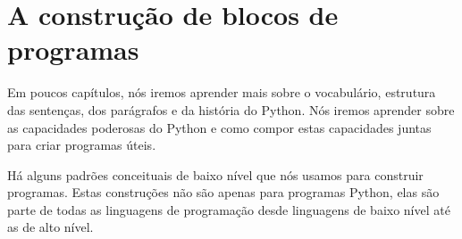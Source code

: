 \section{A construção de blocos de programas}
%

Em poucos capítulos, nós iremos aprender mais sobre o vocabulário, estrutura das sentenças,
dos parágrafos e da história do Python. Nós iremos aprender sobre as capacidades poderosas 
do Python e como compor estas capacidades juntas para criar programas úteis.
%

Há alguns padrões conceituais de baixo nível que nós usamos para construir programas. Estas
construções não são apenas para programas Python, elas são parte de todas as linguagens de
programação desde linguagens de baixo nível até as de alto nível.
%

